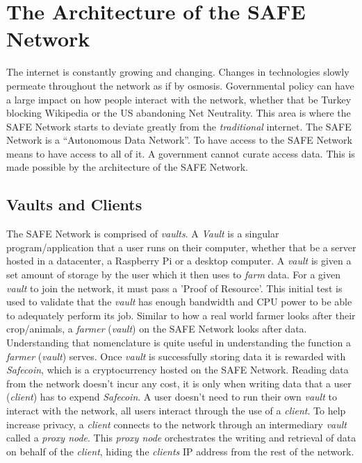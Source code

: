\chapter{The Architecture of the SAFE Network}
\label{ch:architecture}

The internet is constantly growing and changing. Changes in technologies slowly permeate throughout the network as if by osmosis. Governmental policy can have a large impact on how people interact with the network, whether that be Turkey blocking Wikipedia or the US abandoning Net Neutrality. This area is where the SAFE Network starts to deviate greatly from the \textit{traditional} internet. The SAFE Network is a ``Autonomous Data Network''. To have access to the SAFE Network means to have access to all of it. A government cannot curate access data. This is made possible by the architecture of the SAFE Network.

\section{Vaults and Clients}

The SAFE Network is comprised of \textit{vaults}. A \textit{Vault} is a singular program/application that a user runs on their computer, whether that be a server hosted in a datacenter, a Raspberry Pi or a desktop computer. A \textit{vault} is given a set amount of storage by the user which it then uses to \textit{farm} data. For a given \textit{vault} to join the network, it must pass a 'Proof of Resource'. This initial test is used to validate that the \textit{vault} has enough bandwidth and CPU power to be able to adequately perform its job. Similar to how a real world farmer looks after their crop/animals, a \textit{farmer} (\textit{vault}) on the SAFE Network looks after data. Understanding that nomenclature is quite useful in understanding the function a \textit{farmer} (\textit{vault}) serves. Once \textit{vault} is successfully storing data it is rewarded with \textit{Safecoin}, which is a cryptocurrency hosted on the SAFE Network. Reading data from the network doesn't incur any cost, it is only when writing data that a user (\textit{client}) has to expend \textit{Safecoin}. A user doesn't need to run their own \textit{vault} to interact with the network, all users interact through the use of a \textit{client}. To help increase privacy, a \textit{client} connects to the network through an intermediary \textit{vault} called a \textit{proxy node}. This \textit{proxy node} orchestrates the writing and retrieval of data on behalf of the \textit{client}, hiding the \textit{clients} IP address from the rest of the network.

